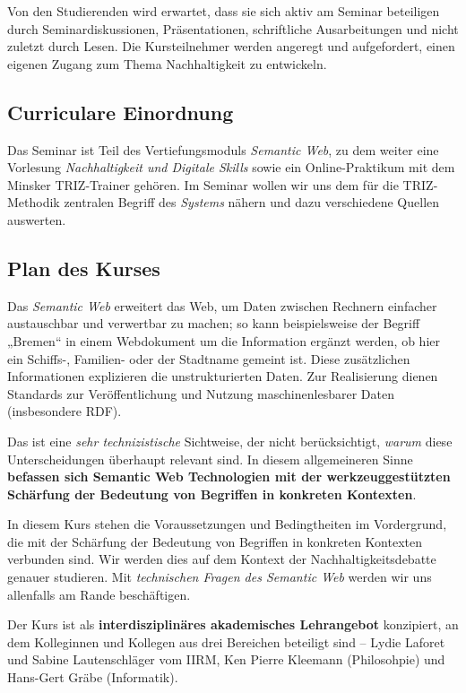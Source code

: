 \documentclass[11pt,a4paper]{article}
\begin{document}
Von den Studierenden wird erwartet, dass sie sich aktiv am Seminar beteiligen
durch Seminardiskussionen, Präsentationen, schriftliche Ausarbeitungen und
nicht zuletzt durch Lesen. Die Kursteilnehmer werden angeregt und
aufgefordert, einen eigenen Zugang zum Thema Nachhaltigkeit zu entwickeln.

\subsection{Curriculare Einordnung}

Das Seminar ist Teil des Vertiefungsmoduls \emph{Semantic Web}, zu dem weiter
eine Vorlesung \emph{Nachhaltigkeit und Digitale Skills} sowie ein
Online-Praktikum mit dem Minsker TRIZ-Trainer gehören. Im Seminar wollen wir
uns dem für die TRIZ-Methodik zentralen Begriff des \emph{Systems} nähern und
dazu verschiedene Quellen auswerten. 

\subsection{Plan des Kurses}

Das \emph{Semantic Web} erweitert das Web, um Daten zwischen Rechnern
einfacher austauschbar und verwertbar zu machen; so kann beispielsweise der
Begriff „Bremen“ in einem Webdokument um die Information ergänzt werden, ob
hier ein Schiffs-, Familien- oder der Stadtname gemeint ist. Diese
zusätzlichen Informationen explizieren die unstrukturierten Daten. Zur
Realisierung dienen Standards zur Veröffentlichung und Nutzung
maschinenlesbarer Daten (insbesondere RDF).

Das ist eine \emph{sehr technizistische} Sichtweise, der nicht
berücksichtigt, \emph{warum} diese Unterscheidungen überhaupt relevant
sind. In diesem allgemeineren Sinne \textbf{befassen sich Semantic Web
Technologien mit der werkzeuggestützten Schärfung der Bedeutung von
Begriffen in konkreten Kontexten}.

In diesem Kurs stehen die Voraussetzungen und Bedingtheiten im Vordergrund,
die mit der Schärfung der Bedeutung von Begriffen in konkreten Kontexten
verbunden sind. Wir werden dies auf dem Kontext der Nachhaltigkeitsdebatte
genauer studieren. Mit \emph{technischen Fragen des Semantic Web} werden wir
uns allenfalls am Rande beschäftigen.

Der Kurs ist als \textbf{interdisziplinäres akademisches Lehrangebot}
konzipiert, an dem Kolleginnen und Kollegen aus drei Bereichen beteiligt sind
-- Lydie Laforet und Sabine Lautenschläger vom IIRM, Ken Pierre Kleemann
(Philosohpie) und Hans-Gert Gräbe (Informatik).
\end{document}
